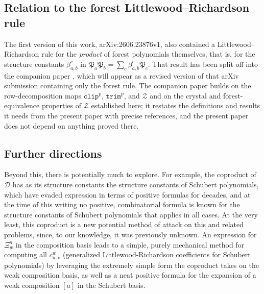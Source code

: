 \documentclass{amsart}
\theoremstyle{definition}
\theoremstyle{remark}
\numberwithin{equation}{subsection}
\newcommand{\trm}{\mathtt{trim}}
\newcommand{\zeromap}{\mathcal{Z}}
\newcommand{\clp}{\mathtt{clip}}
\newcommand{\dsch}{\ensuremath{\Xi}}
\newcommand{\dcoma}{\mathcal{D}}
\newcommand{\forest}{\mathfrak{P}}
\begin{document}
\subsection*{Relation to the forest Littlewood--Richardson rule}

The first version of this work, arXiv:2606.23876v1, also contained a Littlewood--Richardson rule for the \emph{product} of forest polynomials themselves, that is, for the structure constants $\beta_{a,b}^c$ in $\forest_a\forest_b=\sum_c\beta_{a,b}^c\forest_c$. That result has been split off into the companion paper \cite{samuelforest}, which will appear as a revised version of that arXiv submission containing only the forest rule. The companion paper builds on the row-decomposition maps $\clp^p$, $\trm^p$, and $\zeromap$ and on the crystal and forest-equivalence properties of $\zeromap$ established here; it restates the definitions and results it needs from the present paper with precise references, and the present paper does not depend on anything proved there.

\subsection*{Further directions}

Beyond this, there is potentially much to explore. For example, the coproduct of $\dcoma$ has as its structure constants the structure constants of Schubert polynomials, which have evaded expression in terms of positive formulas for decades, and at the time of this writing no positive, combinatorial formula is known for the structure constants of Schubert polynomials that applies in all cases. At the very least, this coproduct is a new potential method of attack on this and related problems, since, to our knowledge, it was previously unknown. An expression for $\dsch_w^n$ in the composition basis leads to a simple, purely mechanical method for computing all $c_{u,v}^w$ (generalized Littlewood-Richardson coefficients for Schubert polynomials) by leveraging the extremely simple form the coproduct takes on the weak composition basis, as well as a neat positive formula for the expansion of a weak composition $[a]$ in the Schubert basis.
\end{document}
